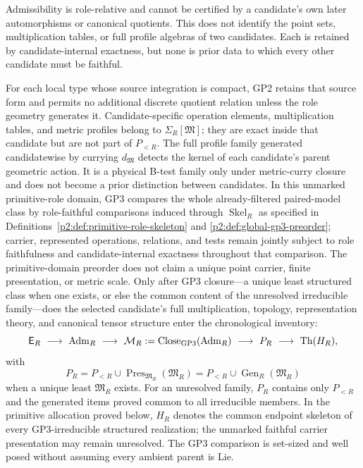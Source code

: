 \documentclass[12pt,a4paper]{article}
\begin{document}
\begin{definition}
Admissibility is role-relative and cannot be certified by a candidate's own
later automorphisms or canonical quotients.  This does not identify the point
sets, multiplication tables, or full profile algebras of two candidates.  Each
is retained by candidate-internal exactness, but none is prior data to which
every other candidate must be faithful.

For each local type whose source integration is compact, GP2 retains that
source form and permits no additional discrete quotient relation unless the
role geometry generates it.  Candidate-specific operation elements,
multiplication tables, and metric profiles belong to
\(\Sigma_R[\mathfrak M]\); they are exact inside that candidate but are not
part of \(P_{<R}\).  The
full profile family generated candidatewise by currying
\(d_{\mathfrak M}\) detects the kernel of each candidate's parent geometric
action.  It is a physical B-test family only under metric-curry closure and
does not become a prior distinction between candidates.  In this unmarked
primitive-role domain, GP3 compares the whole already-filtered paired-model
class by role-faithful comparisons induced through
\(\operatorname{Skel}_R\) as specified in
Definitions~\ref{p2:def:primitive-role-skeleton} and
\ref{p2:def:global-gp3-preorder}; carrier, represented
operations, relations, and tests remain jointly subject to role faithfulness
and candidate-internal exactness throughout that comparison.  The
primitive-domain preorder does
not claim a unique point carrier, finite presentation, or metric scale.  Only
after GP3 closure---a unique least structured class when one exists, or else
the common content of the unresolved irreducible family---does the selected
candidate's full multiplication, topology, representation theory, and
canonical tensor structure enter the chronological inventory:
\[
 \mathsf E_R\ \longrightarrow\
 \operatorname{Adm}_R\ \longrightarrow\
 \mathcal M_R:=\operatorname{Close}_{\rm GP3}(\operatorname{Adm}_R)\ \longrightarrow\
 P_R\ \longrightarrow\ \operatorname{Th}(H_R),
\]
with
\[
 P_R=P_{<R}\cup
 \operatorname{Pres}_{\mathfrak M_R}(\mathfrak M_R)
 =P_{<R}\cup\operatorname{Gen}_R(\mathfrak M_R)
\]
when a unique least \(\mathfrak M_R\) exists.  For an unresolved family,
\(P_R\) contains only \(P_{<R}\) and the generated items proved common to all
irreducible members.
In the primitive allocation proved below, \(H_R\) denotes the common endpoint
skeleton of every GP3-irreducible structured realization; the unmarked
faithful carrier presentation may remain unresolved.  The GP3 comparison is
set-sized and well posed without assuming every ambient parent is Lie.

\end{definition}
\end{document}
